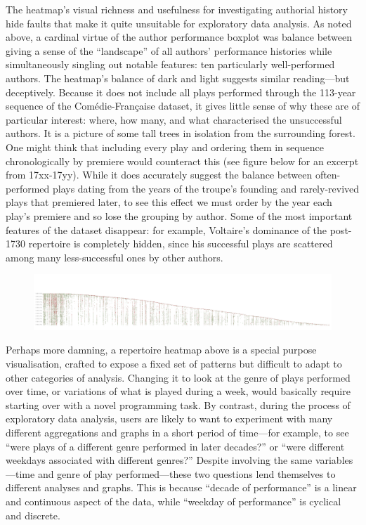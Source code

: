 \documentclass[	DIV=calc,%
							paper=a4,%
							fontsize=11pt,%
							twocolumn]{scrartcl}	 					%
\begin{document}
The heatmap’s visual richness and usefulness for investigating authorial history hide faults that make it quite unsuitable for exploratory data analysis.  As noted above, a cardinal virtue of the author performance boxplot was balance between giving a sense of the ``landscape'' of all authors’ performance histories while simultaneously singling out notable features: ten particularly well-performed authors.  The heatmap’s balance of dark and light suggests similar reading—but deceptively.  Because it does not include all plays performed through the 113-year sequence of the Comédie-Française dataset, it gives little sense of why these are of particular interest: where, how many, and what characterised the unsuccessful authors.  It is a picture of some tall trees in isolation from the surrounding forest.  One might think that including every play and ordering them in sequence chronologically by premiere would counteract this (see figure below for an excerpt from 17xx-17yy).  While it does accurately suggest the balance between often-performed plays dating from the years of the troupe’s founding and rarely-revived plays that premiered later, to see this effect we must order by the year each play’s premiere and so lose the grouping by author.  Some of the most important features of the dataset disappear: for example, Voltaire’s dominance of the post-1730 repertoire is completely hidden, since his successful plays are scattered among many less-successful ones by other authors.

\begin{figure}
  \centering
	\includegraphics[width=6.5in]{viz/repertoire_by_season_all.pdf}
	\caption{}
  \label{fig:heatmap_all}
\end{figure}

Perhaps more damning, a repertoire heatmap above is a special purpose visualisation, crafted to expose a fixed set of patterns but difficult to adapt to other categories of analysis.  Changing it to look at the genre of plays performed over time, or variations of what is played during a week, would basically require starting over with a novel programming task.  By contrast, during the process of exploratory data analysis, users are likely to want to experiment with many different aggregations and graphs in a short period of time—for example, to see ``were plays of a different genre performed in later decades?'' or ``were different weekdays associated with different genres?''  Despite involving the same variables—time and genre of play performed—these two questions lend themselves to different analyses and graphs.  This is because ``decade of performance'' is a linear and continuous aspect of the data, while ``weekday of performance'' is cyclical and discrete.
\end{document}
